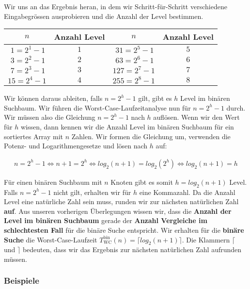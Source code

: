 Wir  uns an das Ergebnis heran, in dem wir Schritt-für-Schritt verschiedene Eingabegrössen ausprobieren und die Anzahl der Level bestimmen.

\begin{table}[htb]
\centering
\begin{tabular}{|c|c||c|c|}
\hline
\textbf{$n$} & \textbf{Anzahl Level} & \textbf{$n$} & \textbf{Anzahl Level} \\ \hline
$~1  = 2^1 - 1$  	& $1$     & $~31 = 2^5 - 1$  & $5$     \\ \hline
$~3  = 2^2 - 1$  	& $2$     & $~63 = 2^6 - 1$  & $6$     \\ \hline
$~7  = 2^3 - 1$  	& $3$     & $127 = 2^7 - 1$ & $7$     \\ \hline
$15 = 2^4 - 1$  	& $4$     & $255 = 2^8 - 1$ & $8$     \\ \hline
\end{tabular}
\end{table}

Wir können daraus ableiten, falls $n = 2^h-1$ gilt, gibt es $h$ Level im binären Suchbaum. Wir führen die Worst-Case-Laufzeitanalyse nun für $n = 2^h-1$ durch. Wir müssen also die Gleichung $n = 2^h-1$ nach $h$ auflösen. Wenn wir den Wert für $h$ wissen, dann kennen wir die Anzahl Level im binären Suchbaum für ein sortiertes Array mit $n$ Zahlen. Wir formen die Gleichung um, verwenden die Potenz- und Logarithmengesetze und lösen nach $h$ auf:

\begin{align*}
 n 	= 2^h-1 \Leftrightarrow  n+1 = 2^h \Leftrightarrow  log_2{(n+1)} = log_2{(2^{h})} \Leftrightarrow log_2{(n+1)} = h
 \end{align*}
 
Für einen binären Suchbaum mit $n$ Knoten gibt es somit $h = log_2{(n+1)}$ Level. Falls $n = 2^h-1$ nicht gilt, erhalten wir für $h$ eine Kommazahl. Da die Anzahl Level eine natürliche Zahl sein muss, runden wir zur nächsten natürlichen Zahl \textbf{auf}. Aus unseren vorherigen Überlegungen wissen wir, dass die\textbf{ Anzahl der Level im binären Suchbaum} gerade der \textbf{Anzahl Vergleiche im schlechtesten Fall} für die binäre Suche entspricht. Wir erhalten für die \textbf{binäre Suche} die Worst-Case-Laufzeit $T_{\text{WC}}^{\text{bin}}(n) = \lceil log_2{(n+1)} \rceil$. Die Klammern $\lceil$ und $\rceil$ bedeuten, dass wir das Ergebnis zur nächsten natürlichen Zahl aufrunden müssen.
 
 \subsubsection{Beispiele}
 

